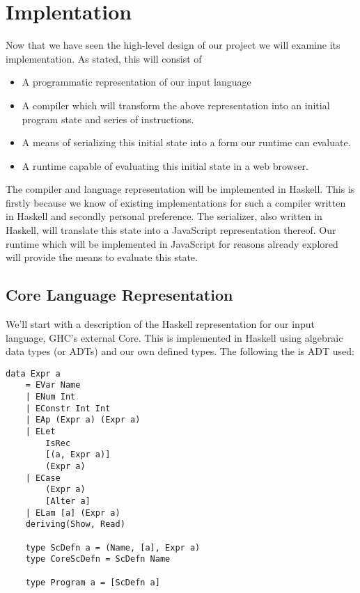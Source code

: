 \section{Implentation}
Now that we have seen the high-level design of our project we will
examine its implementation. As stated, this will consist of

\begin{itemize}
    \item A programmatic representation of our input language
    \item A compiler which will transform the above representation
          into an initial program state and series of instructions.
    \item A means of serializing this initial state into a form our
          runtime can evaluate.
    \item A runtime capable of evaluating this initial state in a
          web browser.
\end{itemize}

The compiler and language representation will be implemented in
Haskell. This is firstly because we know of existing implementations
for such a compiler written in Haskell and secondly personal 
preference. The serializer, also written in Haskell, will translate
this state into a JavaScript representation thereof. Our runtime
which will be implemented in JavaScript for reasons already explored
will provide the means to evaluate this state. 

\subsection{Core Language Representation}
We'll start with a description of the Haskell representation for
our input language, GHC's external Core. This is implemented in
Haskell using algebraic data types (or ADTs) and our own defined
types. The following the is ADT used:

\begin{verbatim}
data Expr a 
    = EVar Name
    | ENum Int
    | EConstr Int Int
    | EAp (Expr a) (Expr a)
    | ELet 
        IsRec
        [(a, Expr a)]
        (Expr a)
    | ECase
        (Expr a)
        [Alter a]
    | ELam [a] (Expr a)
    deriving(Show, Read)

    type ScDefn a = (Name, [a], Expr a)
    type CoreScDefn = ScDefn Name

    type Program a = [ScDefn a]
\end{verbatim}

